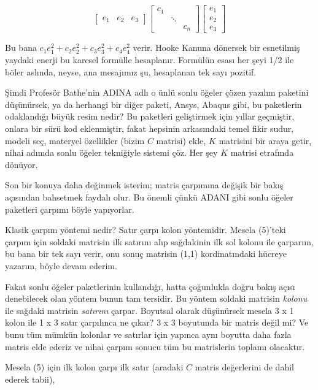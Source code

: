 \documentclass[12pt,fleqn]{article}\usepackage{../../common}
\begin{document}
$$
\left[\begin{array}{rrr}
e_1 & e_2 & e_3 
\end{array}\right]
\left[\begin{array}{rrr}
c_1 &        & \\
    & \ddots & \\
    &        & c_n
\end{array}\right]
\left[\begin{array}{r}
e_1 \\ e_2 \\ e_3
\end{array}\right]
$$

Bu bana $c_1 e_1^2 + c_2 e_2^2 + c_3 e_3^2 + c_4 e_4^2$ verir. Hooke Kanuna
dönersek bir esnetilmiş yaydaki enerji bu karesel formülle hesaplanır. Formülün
esası her şeyi 1/2 ile böler aslında, neyse, ana mesajımız şu, hesaplanan tek
sayı pozitif.

Şimdi Profesör Bathe'nin ADINA adlı o ünlü sonlu öğeler çözen yazılım paketini
düşünürsek, ya da herhangi bir diğer paketi, Ansys, Abaqus gibi, bu paketlerin
odaklandığı büyük resim nedir? Bu paketleri geliştirmek için yıllar geçmiştir,
onlara bir sürü kod eklenmiştir, fakat hepsinin arkasındaki temel fikir sudur,
modeli seç, materyel özellikler (bizim $C$ matrisi) ekle, $K$ matrisini bir
araya getir, nihai adımda sonlu öğeler tekniğiyle sistemi çöz. Her şey $K$
matrisi etrafında dönüyor.

Son bir konuya daha değinmek isterim; matris çarpımına değişik bir bakış
açısından bahsetmek faydalı olur. Bu önemli çünkü ADANI gibi sonlu öğeler
paketleri çarpımı böyle yapıyorlar.

Klasik çarpım yöntemi nedir? Satır çarpı kolon yöntemidir. Mesela (5)'teki
çarpım için soldaki matrisin ilk satırını alıp sağdakinin ilk sol kolonu ile
çarparım, bu bana bir tek sayı verir, onu sonuç matrisin (1,1) kordinatındaki
hücreye yazarım, böyle devam ederim.

Fakat sonlu öğeler paketlerinin kullandığı, hatta çoğunlukla doğru bakış açısı
denebilecek olan yöntem bunun tam tersidir. Bu yöntem soldaki matrisin {\em kolonu}
ile sağdaki matrisin {\em satırını} çarpar. Boyutsal olarak düşünürsek mesela 3 x 1
kolon ile 1 x 3 satır çarpılınca ne çıkar? 3 x 3 boyutunda bir matris değil mi?
Ve bunu tüm mümkün kolonlar ve satırlar için yapınca aynı boyutta daha fazla
matris elde ederiz ve nihai çarpım sonucu tüm bu matrislerin toplamı olacaktır.

Mesela (5) için ilk kolon çarpı ilk satır (aradaki $C$ matris değerlerini de
dahil ederek tabii),
\end{document}
